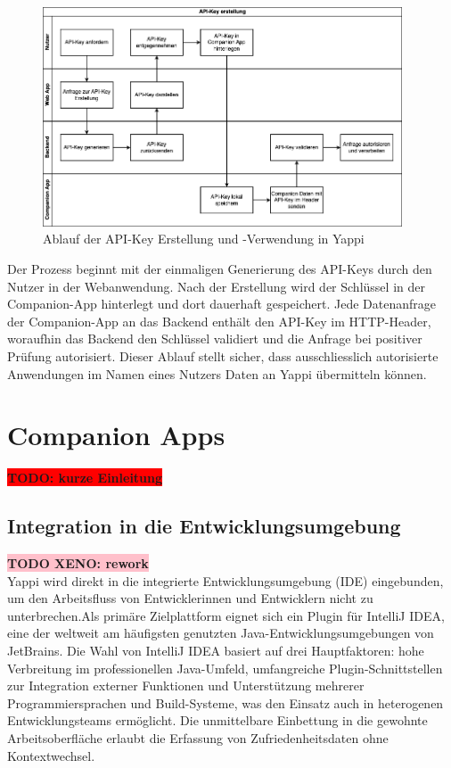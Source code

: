 \documentclass[12pt,a4paper]{report}
\newcommand{\todo}[1]{\colorbox{red}{\textbf{TODO: #1}}\\}
\newcommand{\xeno}[1]{\colorbox{pink}{\textbf{TODO XENO: #1}}\\}
\begin{document}
\begin{figure}[!htbp]
  \centering
  \includegraphics[width=0.95\textwidth]{../figures/apikey-swimlane-diagram.drawio.png}
  \caption{Ablauf der API-Key Erstellung und -Verwendung in Yappi}
  \label{fig:apikey-swimlane}
\end{figure}

Der Prozess beginnt mit der einmaligen Generierung des API-Keys durch den Nutzer in der Webanwendung. Nach der Erstellung wird der
Schlüssel in der Companion-App hinterlegt und dort dauerhaft gespeichert. Jede Datenanfrage der Companion-App an das Backend
enthält den API-Key im HTTP-Header, woraufhin das Backend den Schlüssel validiert und die Anfrage bei positiver Prüfung
autorisiert. Dieser Ablauf stellt sicher, dass ausschliesslich autorisierte Anwendungen im Namen eines Nutzers Daten an Yappi
übermitteln können.

\section{Companion Apps}
\todo{kurze Einleitung}

\subsection{Integration in die Entwicklungsumgebung}

\xeno{rework}

Yappi wird direkt in die integrierte Entwicklungsumgebung (IDE) eingebunden, um den Arbeitsfluss von Entwicklerinnen
und Entwicklern nicht zu unterbrechen.Als primäre Zielplattform eignet sich ein Plugin für IntelliJ IDEA,
eine der weltweit am häufigsten genutzten Java-Entwicklungsumgebungen von JetBrains.
Die Wahl von IntelliJ IDEA basiert auf drei Hauptfaktoren: hohe Verbreitung im professionellen Java-Umfeld,
umfangreiche Plugin-Schnittstellen zur Integration externer Funktionen und Unterstützung mehrerer Programmiersprachen
und Build-Systeme, was den Einsatz auch in heterogenen Entwicklungsteams ermöglicht.
Die unmittelbare Einbettung in die gewohnte Arbeitsoberfläche erlaubt die Erfassung von Zufriedenheitsdaten ohne Kontextwechsel.
\end{document}

